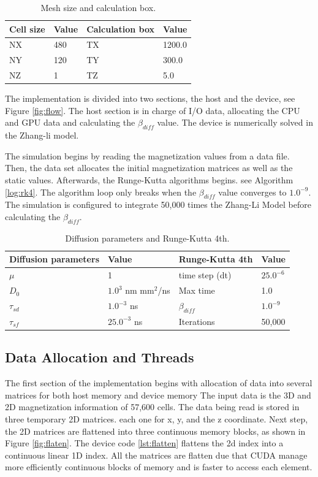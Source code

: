 \begin{table}[h]
\centering
\begin{tabular}{| l | l | l | l |}
\hline
Cell size & Value & Calculation box & Value \\
\hline
 NX & 480 &  TX  & 1200.0   \\
\hline
 NY & 120 &  TY  & 300.0  \\
\hline
 NZ &	1 &  TZ  & 5.0   \\
\hline
\end{tabular}
\caption{Mesh size and calculation box.}
\label{tab:mesh}
\end{table}

The implementation is divided into two sections, the host and the device, see Figure \ref{fig:flow}. The host section is in charge of I/O data, allocating the CPU and GPU data and calculating the $\beta_{diff}$ value. The device is numerically solved in the Zhang-li model.

The simulation begins by reading the magnetization values from a data file. Then, the data set allocates the initial magnetization matrices as well as the static values. Afterwards, the Runge-Kutta algorithms begins. see Algorithm \ref{log:rk4}. The algorithm loop only breaks when the $\beta_{diff}$ value converges to $1.0^{-9}$. The simulation is configured to integrate 50,000 times the Zhang-Li Model before calculating the $\beta_{diff}$.

\begin{table}[h]
\centering
\begin{tabular}{| l | l | l | l |}
\hline
Diffusion parameters& Value & Runge-Kutta 4th & Value \\
\hline 
$\mu$ & 1 &  time step (dt) &   $25.0^{-6}$   \\
\hline
$D_{0}$ & $1.0^{3}$ nm mm$^2$/ns  & Max time  & 1.0  \\
\hline
$\tau_{sd}$ & $1.0^{-3}$ ns  & $\beta_{diff}$ & $1.0^{-9}$ \\
\hline
$\tau_{sf}$ & $25.0^{-3}$ ns  & Iterations & 50,000 \\
\hline
\end{tabular}
\caption{Diffusion parameters and Runge-Kutta 4th.}
\label{tab:drk}
\end{table}

\subsection{Data Allocation and Threads}

The first section of the implementation begins with allocation of data into several matrices for both host memory and device memory The input data is the 3D and 2D magnetization information of 57,600 cells. The data being read is stored in three temporary 2D matrices. each one for x, y, and the z coordinate. Next step, the 2D matrices are flattened into three continuous memory blocks, as shown in Figure \ref{fig:flaten}. The device code \ref{lst:flatten} flattens the 2d index into a continuous linear 1D index. All the matrices are flatten due that CUDA manage more efficiently continuous blocks of memory and is faster to access each element.

